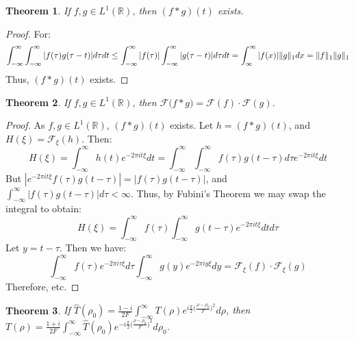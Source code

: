 \documentclass{article}
\theoremstyle{mystyle}
\newtheorem{theorem}{Theorem}[section]
\DeclarePairedDelimiter\norm{\lVert}{\rVert}
\begin{document}
\begin{theorem}
If $f,g\in L^{1}(\mathbb{R})$, then $(f*g)(t)$ exists.
\end{theorem}
\begin{proof}
For:
\begin{equation*}
    \int_{-\infty}^{\infty} \int_{-\infty}^{\infty} |f(\tau)g(\tau-t)|d\tau dt \leq \int_{-\infty}^{\infty} |f(\tau)| \int_{-\infty}^{\infty} |g(\tau-t)|d\tau dt = \int_{\infty}^{\infty}|f(x)|\norm{g}_{1}dx = \norm{f}_{1}\norm{g}_{1}    
\end{equation*}
Thus, $(f*g)(t)$ exists.
\end{proof}
\begin{theorem}
If $f,g\in L^{1}(\mathbb{R})$, then $\mathcal{F}\big(f * g\big) = \mathcal{F}(f)\cdot \mathcal{F}(g)$.
\end{theorem}
\begin{proof}
As $f,g\in L^{1}(\mathbb{R})$, $(f*g)(t)$ exists. Let $h=(f*g)(t)$, and $H(\xi) = \mathcal{F}_{\xi}(h)$. Then:
\begin{equation*}
    H(\xi)=\int_{-\infty}^{\infty}h(t)e^{-2\pi it\xi}dt= \int_{-\infty}^{\infty} \int_{-\infty}^{\infty} f(\tau)g(t-\tau)d\tau e^{-2\pi i t\xi}dt    
\end{equation*}
But $|e^{-2\pi i t \xi}f(\tau)g(t-\tau)| = |f(\tau)g(t-\tau)|$, and $\int_{-\infty}^{\infty}|f(\tau)g(t-\tau)|d\tau < \infty$. Thus, by Fubini's Theorem we may swap the integral to obtain:
\begin{equation*}
    H(\xi)=\int_{-\infty}^{\infty} f(\tau)\int_{-\infty}^{\infty}g(t-\tau)e^{-2\pi i t\xi}dtd\tau    
\end{equation*}
Let $y = t-\tau$. Then we have:
\begin{equation*}
    \int_{-\infty}^{\infty} f(\tau)e^{-2\pi i \tau \xi}d\tau \int_{-\infty}^{\infty}g(y) e^{-2\pi i y \xi}dy = \mathcal{F}_{\xi}(f) \cdot \mathcal{F}_{\xi}(g)    
\end{equation*}
Therefore, etc.
\end{proof}
\begin{theorem}
If $\hat{T}(\rho_0) = \frac{1-i}{2F}\int_{-\infty}^{\infty}T(\rho) e^{i\frac{\pi}{2}\big(\frac{\rho-\rho_0}{F}\big)^2}d\rho$, then $T(\rho) = \frac{1+i}{2F}\int_{-\infty}^{\infty}\hat{T}(\rho_0)e^{-i\frac{\pi}{2}\big(\frac{\rho-\rho_0}{F}\big)^2}d\rho_0$.
\end{theorem}
\end{document}
